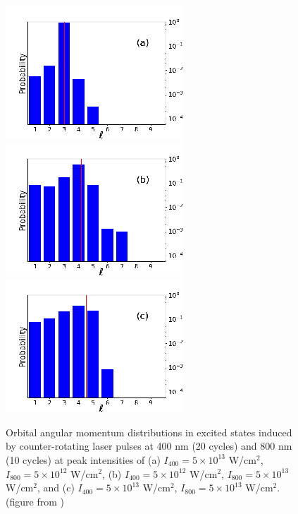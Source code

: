 \begin{figure}[!ht]
\centering
\includegraphics[width=0.32\columnwidth]{figs/Rydberg/Gebre-bicircular-Fig9a.png}
\includegraphics[width=0.32\columnwidth]{figs/Rydberg/Gebre-bicircular-Fig9b.png}
\includegraphics[width=0.32\columnwidth]{figs/Rydberg/Gebre-bicircular-Fig9c.png}
\caption{\label{fig:angular}
Orbital angular momentum distributions in excited states induced by counter-rotating laser pulses at 400 nm (20 cycles) and 800 nm (10 cycles) at peak intensities of (a) $I_{400} =  5 \times 10^{13}$ W/cm$^2$, $I_{800} = 5 \times 10^{12}$ W/cm$^2$, (b) $I_{400} = 5 \times 10^{12}$ W/cm$^2$, $I_{800} =  5 \times 10^{13}$ W/cm$^2$, and (c) $I_{400} = 5 \times 10^{13}$ W/cm$^2$, $I_{800} = 5 \times 10^{13}$ W/cm$^2$. (figure from \cite{venzke2020_ryd})
}
\end{figure}

